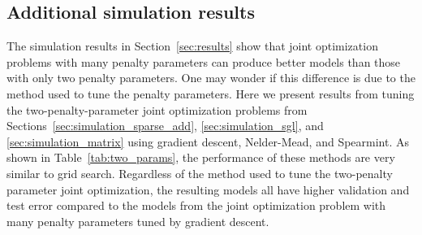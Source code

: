 \documentclass[12pt,letterpaper]{article}
\begin{document}
\subsection{Additional simulation results}

The simulation results in Section~\ref{sec:results} show that joint optimization problems with many penalty parameters can produce better models than those with only two penalty parameters. One may wonder if this difference is due to the method used to tune the penalty parameters. Here we present results from tuning the two-penalty-parameter joint optimization problems from Sections~\ref{sec:simulation_sparse_add}, \ref{sec:simulation_sgl}, and \ref{sec:simulation_matrix} using gradient descent, Nelder-Mead, and Spearmint. As shown in Table~\ref{tab:two_params}, the performance of these methods are very similar to grid search. Regardless of the method used to tune the two-penalty parameter joint optimization, the resulting models all have higher validation and test error compared to the models from the joint optimization problem with many penalty parameters tuned by gradient descent.
\end{document}
